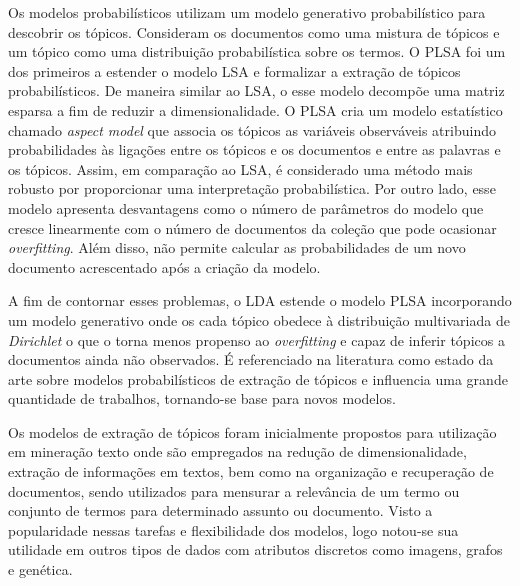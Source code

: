 Os modelos probabilísticos utilizam um modelo generativo probabilístico para descobrir os tópicos. Consideram os documentos como uma mistura de tópicos e um tópico como uma distribuição probabilística sobre os termos.
O PLSA foi um dos primeiros a estender o modelo LSA e formalizar a extração de tópicos probabilísticos. De maneira similar ao LSA, o esse modelo decompõe uma matriz esparsa a fim de reduzir a dimensionalidade. O PLSA cria um modelo estatístico chamado \textit{aspect model} que associa os tópicos as variáveis observáveis atribuindo probabilidades às ligações entre os tópicos e os documentos e entre as palavras e os tópicos. Assim, em comparação ao LSA, é considerado uma método mais robusto por proporcionar uma interpretação probabilística. Por outro lado, esse modelo apresenta desvantagens como o número de parâmetros do modelo que cresce linearmente com o número de documentos da coleção que pode ocasionar \textit{overfitting}. Além disso, não permite calcular as probabilidades de um novo documento acrescentado após a criação da modelo.  %


A fim de contornar esses problemas, o LDA estende o modelo PLSA incorporando um modelo generativo onde os cada tópico obedece à distribuição multivariada de \textit{Dirichlet} o que o torna menos propenso ao \textit{overfitting} e capaz de inferir tópicos a documentos ainda não observados. É referenciado na literatura como estado da arte sobre modelos probabilísticos de extração de tópicos e influencia uma grande quantidade de trabalhos, tornando-se base para novos modelos.

Os modelos de extração de tópicos foram inicialmente propostos para utilização em mineração texto onde são empregados na redução de dimensionalidade, extração de informações em textos, bem como na organização e recuperação de documentos, sendo utilizados para mensurar a relevância de um termo ou conjunto de termos para determinado assunto ou documento. Visto a popularidade nessas tarefas e flexibilidade dos modelos, logo notou-se sua utilidade em outros tipos de dados com atributos discretos como imagens, grafos e genética. 



























